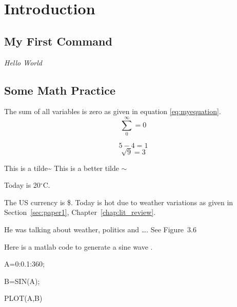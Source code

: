 \chapter{Introduction}

\section{My First Command}
\emph{Hello World}
\begin{comment}
How are you How are you How are you How are you How are you How are you How are you How are you How are you How are you How are you How are you How are you How are you How are you How are you How are you How are you How are you How are you How are you How are you How are you How are you How are you How are you How are you How are you How are you How are you How are you

How are you How are you How are you How are you
\end{comment}

\section{Some Math Practice}
The sum of all variables is zero as given in equation \ref{eq:myequation}.
\begin{equation}
\sum_0^\infty=0
\label{eq:myequation}
\end{equation}

\begin{equation}
5-4=1
\end{equation}
\begin{equation}
\sqrt{9}=3
\end{equation}

This is a tilde\~{}
This is a better tilde $\sim$

Today is 20$^\circ$C.

The US currency is \$.              Today is hot due to weather variations as given in Section~\ref{sec:paper1}, Chapter~\ref{chap:lit_review}.

He was talking about weather, politics and \ldots.  See Figure~3.6

Here is a matlab code to generate a sine wave \cite{bhargava2018study}.


A=0:0.1:360;

B=SIN(A);

PLOT(A,B)
